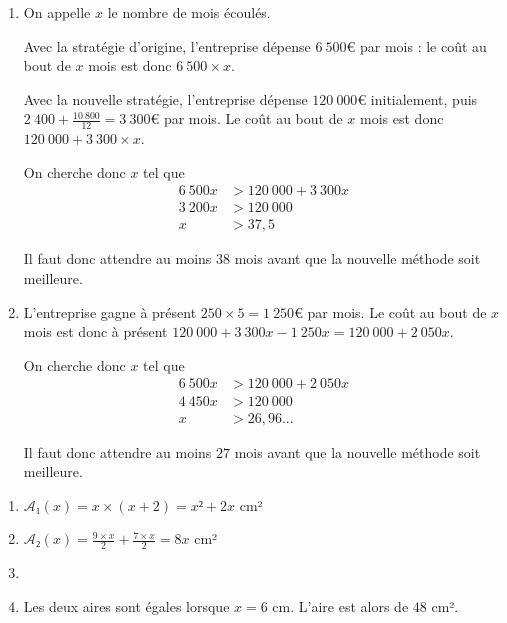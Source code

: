 \documentclass[
	classe=1 STI2D,
	gray,
	surFeuille,
	headerTitle=Évaluation\space Chapitre\space 2
]{évaluation}
\begin{document}
\begin{exercice}
	\begin{enumerate}
		\item On appelle $x$ le nombre de mois écoulés.

		      Avec la stratégie d'origine, l'entreprise dépense $6\ 500€$ par mois : le coût au bout de $x$ mois est donc $6\ 500 × x$.

		      Avec la nouvelle stratégie, l'entreprise dépense $120\ 000€$ initialement, puis $2\ 400 + \frac{10\ 800}{12} = 3\ 300€$ par mois. Le coût au bout de $x$ mois est donc $120\ 000 + 3\ 300 × x$.

		      On cherche  donc $x$ tel que
		      \begin{align*}
			      6\ 500x & > 120\ 000 + 3\ 300x \\
			      3\ 200x & > 120\ 000           \\
			      x       & > 37,5
		      \end{align*}

		      Il faut donc attendre au moins $38$ mois avant que la nouvelle méthode soit meilleure.
		\item L'entreprise gagne à présent $250 × 5 = 1\ 250€$ par mois. Le coût au bout de $x$ mois est donc à présent $120\ 000 + 3\ 300x - 1\ 250x = 120\ 000 + 2\ 050x$.

		      On cherche donc $x$ tel que
		      \begin{align*}
			      6\ 500x & > 120\ 000 + 2\ 050x \\
			      4\ 450x & > 120\ 000           \\
			      x       & > 26,96...
		      \end{align*}

		      Il faut donc attendre au moins $27$ mois avant que la nouvelle méthode soit meilleure.
	\end{enumerate}
\end{exercice}

\begin{exercice}
	\begin{enumerate}
		\item $𝒜₁(x) = x × (x+2) = x² + 2x$ cm²
		\item $𝒜₂(x) = \frac{9×x}{2} + \frac{7×x}{2} = 8x$ cm²
		\item {}
		\item Les deux aires sont égales lorsque $x = 6$ cm. L'aire est alors de $48$ cm².
	\end{enumerate}
\end{exercice}
\end{document}
